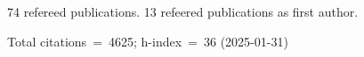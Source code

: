 74 refereed publications. 13 refeered publications as first author.

Total citations~=~4625; h-index~=~36 (2025-01-31)